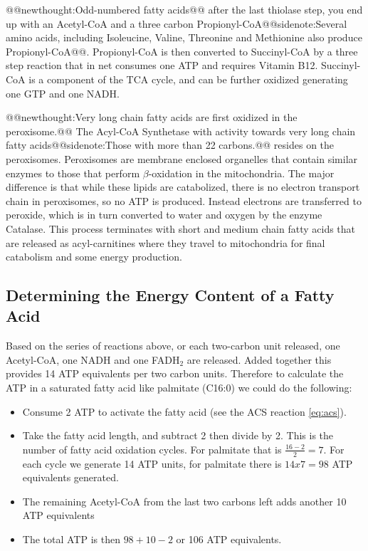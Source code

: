 \documentclass{tufte-handout}
\makeatletter
\def\newthought#1{@@newthought:#1@@}
\def\sidenote#1{@@sidenote:#1@@}
\makeatother
\begin{document}
\newthought{Odd-numbered fatty acids} after the last thiolase step, you end up with an Acetyl-CoA and a three carbon Propionyl-CoA\sidenote{Several amino acids, including Isoleucine, Valine, Threonine and Methionine also produce Propionyl-CoA}.  Propionyl-CoA is then converted to Succinyl-CoA by a three step reaction that in net consumes one ATP and requires Vitamin B12.  Succinyl-CoA is a component of the TCA cycle, and can be further oxidized generating one GTP and one NADH.  

\newthought{Very long chain fatty acids are first oxidized in the peroxisome.}  The Acyl-CoA Synthetase with activity towards very long chain fatty acids\sidenote{Those with more than 22 carbons.} resides on the peroxisomes.  Peroxisomes are membrane enclosed organelles that contain similar enzymes to those that perform $\beta$-oxidation in the mitochondria.  The major difference is that while these lipids are catabolized, there is no electron transport chain in peroxisomes, so no ATP is produced.  Instead electrons are transferred to peroxide, which is in turn converted to water and oxygen by the enzyme Catalase.  This process terminates with short and medium chain fatty acids that are released as acyl-carnitines where they travel to mitochondria for final catabolism and some energy production.

\subsection{Determining the Energy Content of a Fatty Acid}

Based on the series of reactions above, or each two-carbon unit released, one Acetyl-CoA, one NADH and one FADH$_2$ are released.  Added together this provides 14 ATP equivalents per two carbon units.  Therefore to calculate the ATP in a saturated fatty acid like palmitate (C16:0) we could do the following:

\begin{itemize}
\item Consume 2 ATP to activate the fatty acid (see the ACS reaction \ref{eq:acs}).
\item Take the fatty acid length, and subtract 2 then divide by 2.  This is the number of fatty acid oxidation cycles.  For palmitate that is $\frac{16-2}{2}=7$.  For each cycle we generate 14 ATP units, for palmitate there is $14 x 7 = 98$ ATP equivalents generated.
\item The remaining Acetyl-CoA from the last two carbons left adds another 10 ATP equivalents
\item The total ATP is then $98+10-2$ or 106 ATP equivalents.
\end{itemize}
\end{document}

